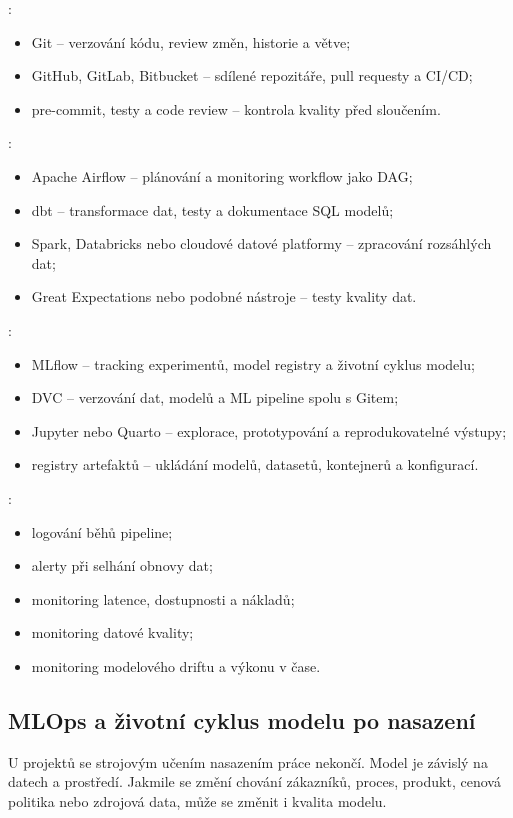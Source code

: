 :
\begin{itemize}
  \item Git -- verzování kódu, review změn, historie a větve;
  \item GitHub, GitLab, Bitbucket -- sdílené repozitáře, pull requesty a CI/CD;
  \item pre-commit, testy a code review -- kontrola kvality před sloučením.
\end{itemize}

:
\begin{itemize}
  \item Apache Airflow -- plánování a monitoring workflow jako DAG;
  \item dbt -- transformace dat, testy a dokumentace SQL modelů;
  \item Spark, Databricks nebo cloudové datové platformy -- zpracování rozsáhlých dat;
  \item Great Expectations nebo podobné nástroje -- testy kvality dat.
\end{itemize}

:
\begin{itemize}
  \item MLflow -- tracking experimentů, model registry a životní cyklus modelu;
  \item DVC -- verzování dat, modelů a ML pipeline spolu s Gitem;
  \item Jupyter nebo Quarto -- explorace, prototypování a reprodukovatelné výstupy;
  \item registry artefaktů -- ukládání modelů, datasetů, kontejnerů a konfigurací.
\end{itemize}

:
\begin{itemize}
  \item logování běhů pipeline;
  \item alerty při selhání obnovy dat;
  \item monitoring latence, dostupnosti a nákladů;
  \item monitoring datové kvality;
  \item monitoring modelového driftu a výkonu v čase.
\end{itemize}

\subsection{MLOps a životní cyklus modelu po nasazení}
U projektů se strojovým učením nasazením práce nekončí. Model je závislý na datech a prostředí. Jakmile se změní chování zákazníků, proces, produkt, cenová politika nebo zdrojová data, může se změnit i kvalita modelu.

